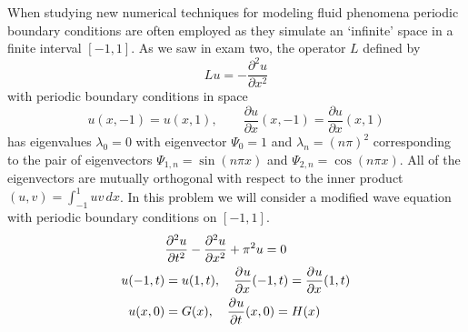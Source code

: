 When studying new numerical techniques for modeling fluid phenomena periodic boundary conditions are often employed as they simulate an `infinite' space in a finite interval $\left[ -1, 1 \right]$.  As we saw in exam two, the operator $L$ defined by
\[
Lu = -\frac{\partial^{2}u}{\partial x^2}
\]
with periodic boundary conditions in space 
\[
u( x, -1) = u(x,1), \qquad \frac{\partial u}{\partial x}(x,-1) = \frac{\partial u}{\partial {x}}(x,1)
\]
has eigenvalues $\lambda_{0} = 0$ with eigenvector $\Psi_{0} = 1$ and $\lambda_{n} = \left( n\pi \right)^{2}$ corresponding to the pair of eigenvectors $\Psi_{1,n} = \sin(n\pi x)$ and $\Psi_{2,n} = \cos(n\pi x)$.  All of the eigenvectors are mutually orthogonal with respect to the inner product $\left(u,v\right) = \int_{-1}^{1} uv \, dx$.  In this problem we will consider a modified wave equation with periodic boundary conditions on $\left[ -1, 1 \right]$.  
\begin{align}
\label{eqn:modif_wave_damping}
&\frac{\partial^{2} u}{\partial t^{2}}  - \frac{\partial^{2} u}{\partial x^{2}} + \pi^2 u  = 0 \\
		  u(-1,t)  &=   u(1,t), \quad \frac{\partial^{} u}{\partial x^{}}(-1,t)  = \frac{\partial^{} u}{\partial x^{}}(1,t)\\
		  		   u(x,0) &= G(x), \quad \frac{\partial^{} u}{\partial t^{}}(x,0) = H(x) 
\end{align}


